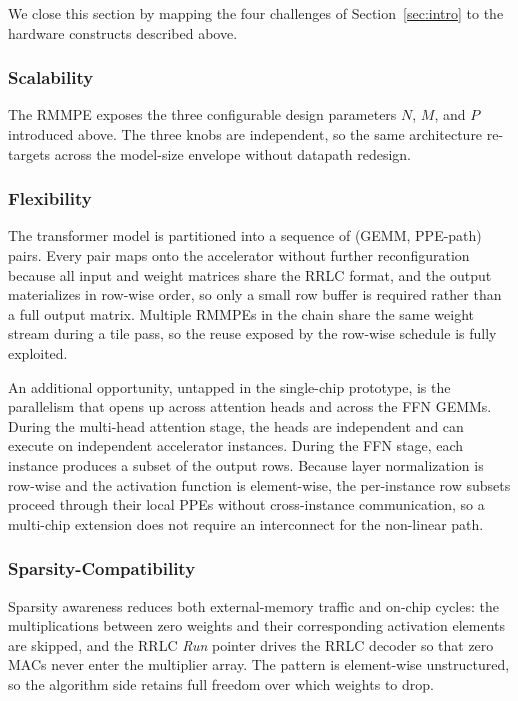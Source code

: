 \documentclass[lettersize,journal]{IEEEtran}
\begin{document}
We close this section by mapping the four challenges of Section~\ref{sec:intro} to the hardware constructs described above.

\subsubsection{Scalability}
\label{sec:arch-challenges-scalability}

The RMMPE exposes the three configurable design parameters $N$, $M$, and $P$ introduced above. The three knobs are independent, so the same architecture re-targets across the model-size envelope without datapath redesign.

\subsubsection{Flexibility}
\label{sec:arch-challenges-flexibility}

The transformer model is partitioned into a sequence of (GEMM, PPE-path) pairs. Every pair maps onto the accelerator without further reconfiguration because all input and weight matrices share the RRLC format, and the output materializes in row-wise order, so only a small row buffer is required rather than a full output matrix. Multiple RMMPEs in the chain share the same weight stream during a tile pass, so the reuse exposed by the row-wise schedule is fully exploited.

An additional opportunity, untapped in the single-chip prototype, is the parallelism that opens up across attention heads and across the FFN GEMMs. During the multi-head attention stage, the heads are independent and can execute on independent accelerator instances. During the FFN stage, each instance produces a subset of the output rows. Because layer normalization is row-wise and the activation function is element-wise, the per-instance row subsets proceed through their local PPEs without cross-instance communication, so a multi-chip extension does not require an interconnect for the non-linear path.

\subsubsection{Sparsity-Compatibility}
\label{sec:arch-challenges-sparsity}

Sparsity awareness reduces both external-memory traffic and on-chip cycles: the multiplications between zero weights and their corresponding activation elements are skipped, and the RRLC \textit{Run} pointer drives the RRLC decoder so that zero MACs never enter the multiplier array. The pattern is element-wise unstructured, so the algorithm side retains full freedom over which weights to drop.
\end{document}
